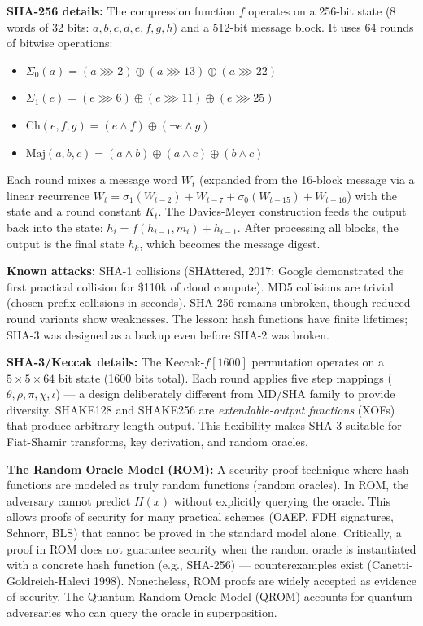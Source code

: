 \textbf{SHA-256 details:} The compression function $f$ operates on a 256-bit state (8 words of 32 bits: $a, b, c, d, e, f, g, h$) and a 512-bit message block. It uses 64 rounds of bitwise operations:
\begin{itemize}
\item $\Sigma_0(a) = (a \ggg 2) \oplus (a \ggg 13) \oplus (a \ggg 22)$
\item $\Sigma_1(e) = (e \ggg 6) \oplus (e \ggg 11) \oplus (e \ggg 25)$
\item $\text{Ch}(e,f,g) = (e \land f) \oplus (\lnot e \land g)$
\item $\text{Maj}(a,b,c) = (a \land b) \oplus (a \land c) \oplus (b \land c)$
\end{itemize}
Each round mixes a message word $W_t$ (expanded from the 16-block message via a linear recurrence $W_t = \sigma_1(W_{t-2}) + W_{t-7} + \sigma_0(W_{t-15}) + W_{t-16}$) with the state and a round constant $K_t$. The Davies-Meyer construction feeds the output back into the state: $h_i = f(h_{i-1}, m_i) + h_{i-1}$. After processing all blocks, the output is the final state $h_k$, which becomes the message digest.

\textbf{Known attacks:} SHA-1 collisions (SHAttered, 2017: Google demonstrated the first practical collision for \$110k of cloud compute). MD5 collisions are trivial (chosen-prefix collisions in seconds). SHA-256 remains unbroken, though reduced-round variants show weaknesses. The lesson: hash functions have finite lifetimes; SHA-3 was designed as a backup even before SHA-2 was broken.

\textbf{SHA-3/Keccak details:} The Keccak-$f[1600]$ permutation operates on a $5 \times 5 \times 64$ bit state (1600 bits total). Each round applies five step mappings ($\theta, \rho, \pi, \chi, \iota$) — a design deliberately different from MD/SHA family to provide diversity. SHAKE128 and SHAKE256 are \emph{extendable-output functions} (XOFs) that produce arbitrary-length output. This flexibility makes SHA-3 suitable for Fiat-Shamir transforms, key derivation, and random oracles.

\textbf{The Random Oracle Model (ROM):} A security proof technique where hash functions are modeled as truly random functions (random oracles). In ROM, the adversary cannot predict $H(x)$ without explicitly querying the oracle. This allows proofs of security for many practical schemes (OAEP, FDH signatures, Schnorr, BLS) that cannot be proved in the standard model alone. Critically, a proof in ROM does not guarantee security when the random oracle is instantiated with a concrete hash function (e.g., SHA-256) — counterexamples exist (Canetti-Goldreich-Halevi 1998). Nonetheless, ROM proofs are widely accepted as evidence of security. The Quantum Random Oracle Model (QROM) accounts for quantum adversaries who can query the oracle in superposition.

